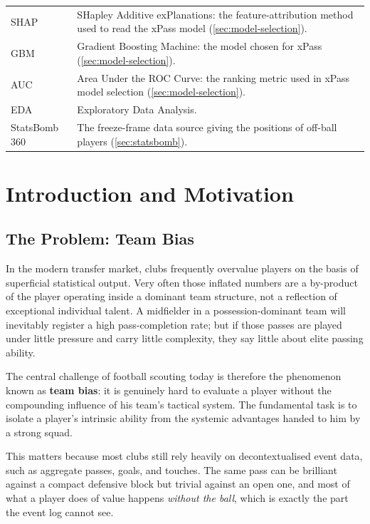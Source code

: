 \documentclass[12pt,a4paper]{article}
\begin{document}
\begin{table}[H]
\begin{tabularx}{\textwidth}{@{}lL@{}}
SHAP  & SHapley Additive exPlanations: the feature-attribution method used to read the xPass model (\cref{sec:model-selection}). \\
GBM   & Gradient Boosting Machine: the model chosen for xPass (\cref{sec:model-selection}). \\
AUC   & Area Under the ROC Curve: the ranking metric used in xPass model selection (\cref{sec:model-selection}). \\
EDA   & Exploratory Data Analysis. \\
StatsBomb 360 & The freeze-frame data source giving the positions of off-ball players (\cref{sec:statsbomb}). \\
\bottomrule
\end{tabularx}
\end{table}
\renewcommand{\arraystretch}{1.0}

\clearpage
\section{Introduction and Motivation}\label{sec:intro}

\subsection{The Problem: Team Bias}\label{sec:team-bias}

In the modern transfer market, clubs frequently overvalue players on the basis of superficial statistical output.
Very often those inflated numbers are a by-product of the player operating inside a dominant team structure, not a reflection of exceptional individual talent.
A midfielder in a possession-dominant team will inevitably register a high pass-completion rate; but if those passes are played under little pressure and carry little complexity, they say little about elite passing ability.

The central challenge of football scouting today is therefore the phenomenon known as \textbf{team bias}: it is genuinely hard to evaluate a player without the compounding influence of his team's tactical system.
The fundamental task is to isolate a player's intrinsic ability from the systemic advantages handed to him by a strong squad.

This matters because most clubs still rely heavily on decontextualised event data, such as aggregate passes, goals, and touches.
The same pass can be brilliant against a compact defensive block but trivial against an open one, and most of what a player does of value happens \emph{without the ball}, which is exactly the part the event log cannot see.
\end{document}
